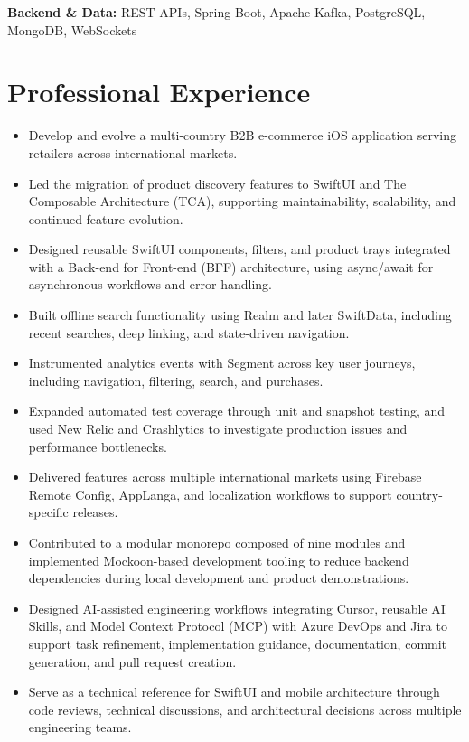 \documentclass[10pt,a4paper]{article}
\begin{document}
\textbf{Backend \& Data:}
REST APIs, Spring Boot, Apache Kafka, PostgreSQL, MongoDB, WebSockets


\section{Professional Experience}


\begin{itemize}
    \item Develop and evolve a multi-country B2B e-commerce iOS application serving retailers across international markets.
    \item Led the migration of product discovery features to SwiftUI and The Composable Architecture (TCA), supporting maintainability, scalability, and continued feature evolution.
    \item Designed reusable SwiftUI components, filters, and product trays integrated with a Back-end for Front-end (BFF) architecture, using async/await for asynchronous workflows and error handling.
    \item Built offline search functionality using Realm and later SwiftData, including recent searches, deep linking, and state-driven navigation.
    \item Instrumented analytics events with Segment across key user journeys, including navigation, filtering, search, and purchases.
    \item Expanded automated test coverage through unit and snapshot testing, and used New Relic and Crashlytics to investigate production issues and performance bottlenecks.
    \item Delivered features across multiple international markets using Firebase Remote Config, AppLanga, and localization workflows to support country-specific releases.
    \item Contributed to a modular monorepo composed of nine modules and implemented Mockoon-based development tooling to reduce backend dependencies during local development and product demonstrations.
    \item Designed AI-assisted engineering workflows integrating Cursor, reusable AI Skills, and Model Context Protocol (MCP) with Azure DevOps and Jira to support task refinement, implementation guidance, documentation, commit generation, and pull request creation.
    \item Serve as a technical reference for SwiftUI and mobile architecture through code reviews, technical discussions, and architectural decisions across multiple engineering teams.
\end{itemize}
\end{document}
